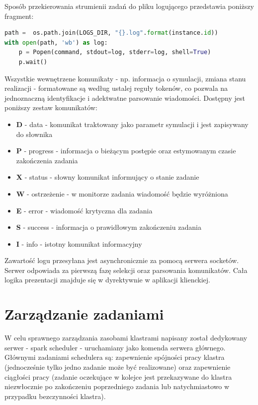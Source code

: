 \documentclass[a4paper,onecolumn,oneside,12pt]{memoir}
\begin{document}
{Sposób przekierowania strumienii zadań do pliku logującego przedstawia poniższy fragment:

\begin{lstlisting}[language=Python, caption=Tworzenie logu]
path =  os.path.join(LOGS_DIR, "{}.log".format(instance.id))
with open(path, 'wb') as log:
	p = Popen(command, stdout=log, stderr=log, shell=True)
	p.wait()
\end{lstlisting}

Wszystkie wewnętrzene komunikaty - np. informacja o symulacji, zmiana stanu realizacji -
formatowane są według ustalej reguły tokenów, co pozwala na jednoznaczną identyfikacje
i adektwatne parsowanie wiadomości. Dostępny jest poniższy zestaw komunikatów:
\pagebreak
\begin{itemize}
\item \textbf{D} - data - komunikat traktowany jako parametr symulacji i jest zapisywany
do słownika
\item \textbf{P} - progress - informacja o bieżącym postępie oraz estymowanym czasie
zakończenia zadania
\item \textbf{X} - status - słowny komunikat informujący o stanie zadanie
\item \textbf{W} - ostrzeżenie - w monitorze zadania wiadomość będzie wyróżniona
\item \textbf{E} - error - wiadomość krytyczna dla zadania
\item \textbf{S} - success - informacja o prawidłowym zakończeniu zadania
\item \textbf{I} - info - istotny komunikat informacyjny
\end{itemize}

Zawartość logu przesyłana jest asynchronicznie za pomocą serwera socketów. Serwer
odpowiada za pierwszą fazę selekcji oraz parsowania komunikatów. Cała logika prezentacji
znajduje się w dyrektywnie w aplikacji klienckiej.

\section{Zarządzanie zadaniami}
\quad \quad W celu sprawnego zarządzania zasobami klastrami napisany został dedykowany
serwer - spark scheduler - uruchamiany jako komenda serwera głównego. Głównymi zadaniami
schedulera są: zapewnienie spójności pracy klastra (jednocześnie tylko jedno zadanie
może być realizowane) oraz zapewnienie ciągłości pracy (zadanie oczekujące w kolejce
jest przekazywane do klastra niezwłocznie po zakończeniu poprzedniego zadania lub
natychmiastowo w przypadku bezczynności klastra).

}
\end{document}
